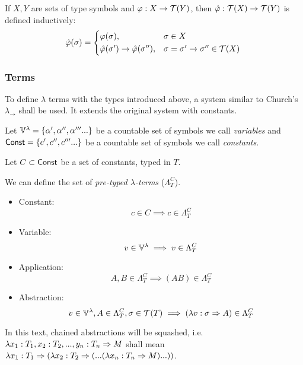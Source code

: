 \documentclass[main.tex]{subfiles}
\begin{document}
\begin{defn}
    If $X, Y$ are sets of type symbols and $\varphi: X \rightarrow \mathcal{T}( Y )$,
    then $\hat{\varphi} : \mathcal{T}( X ) \rightarrow \mathcal{T}( Y )$ is defined inductively:
    \begin{equation*}
        \hat{\varphi}(\sigma) =
        \begin{cases*}
            \varphi(\sigma), & $\sigma \in X$ \\
            \hat{\varphi}(\sigma') \rightarrow \hat{\varphi}(\sigma''), &
                $\sigma = \sigma' \rightarrow \sigma'' \in \tclos{X}$ \\
        \end{cases*}
    \end{equation*}
\end{defn}

\subsubsection{Terms}
To define $\lambda$ terms with the types introduced above, a system similar
to Church's $\lambda_\rightarrow$ \cite[chap.~2.4]{ttfp} shall be used. It
extends the original system with constants.

Let $\mathbb{V}^{\lambda} = \{ \alpha', \alpha'', \alpha''' ... \}$ be a countable set of symbols
we call \emph{variables} and $\mathsf{Const} = \{ c', c'', c''' ... \}$ be a countable
set of symbols we call \emph{constants}.

\begin{defn}
    Let $C \subset \mathsf{Const}$ be a set of constants, typed in $T$.

    We can define the set of
    \emph{pre-typed $\lambda$-terms} ($\Lambda_T^C$).

    \begin{itemize}
        \item Constant:    \[ c \in C \implies c \in \Lambda_T^C \]
        \item Variable:    \[ v \in \mathbb{V}^{\lambda} \implies v \in \Lambda_T^C \]
        \item Application: \[ A, B \in \Lambda_T^C \implies (AB) \in \Lambda_T^C \]
        \item Abstraction: \[ v \in \mathbb{V}^{\lambda}, A \in \Lambda_T^C, \sigma \in \mathcal{T}( T )
                \implies (\lambda v : \sigma \Rightarrow A) \in \Lambda_T^C \]
    \end{itemize}
\end{defn}

In this text, chained abstractions will be squashed, i.e.
$\lambda x_1 : T_1, x_2: T_2, ..., y_n: T_n \Rightarrow M$ shall mean
$\lambda x_1 : T_1 \Rightarrow (\lambda x_2: T_2 \Rightarrow (... (\lambda x_n: T_n \Rightarrow M) ...))$.
\end{document}
